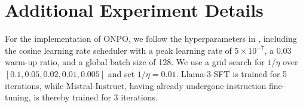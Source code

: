 \section{Additional Experiment Details}
For the implementation of ONPO, we follow the hyperparameters in \citet{dong2024rlhf}, including the cosine learning rate scheduler with a peak learning rate of $5 \times 10^{-7}$, a 0.03 warm-up ratio, and a global batch size of 128. We use a grid search for $1/\eta$ over $[0.1, 0.05, 0.02, 0.01, 0.005]$ and set $1/\eta = 0.01$. Llama-3-SFT is trained for 5 iterations, while Mistral-Instruct, having already undergone instruction fine-tuning, is thereby trained for 3 iterations.
